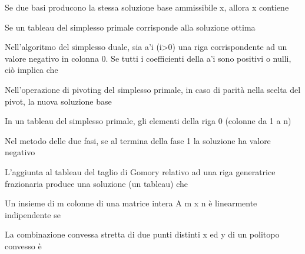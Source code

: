 \documentclass[answers, a4paper, 11pt]{exam}
\begin{document}
\begin{questions}
\begin{solution}
\end{solution}

\question Se due basi producono la stessa soluzione base ammissibile x, allora x contiene
\begin{solution}

\end{solution}

\question Se un tableau del simplesso primale corrisponde alla soluzione ottima
\begin{solution}

\end{solution}

\question Nell'algoritmo del simplesso duale, sia a'i (i>0) una riga corrispondente ad un valore negativo in colonna 0. Se tutti i coefficienti della a'i sono positivi o nulli, ciò implica che
\begin{solution}

\end{solution}

\question Nell'operazione di pivoting del simplesso primale, in caso di parità nella scelta del pivot, la nuova soluzione base
\begin{solution}

\end{solution}

\question In un tableau del simplesso primale, gli elementi della riga 0 (colonne da 1 a n)
\begin{solution}

\end{solution}

\question Nel metodo delle due fasi, se al termina della fase 1 la soluzione ha valore negativo
\begin{solution}

\end{solution}

\question L'aggiunta al tableau del taglio di Gomory relativo ad una riga generatrice frazionaria produce una soluzione (un tableau) che
\begin{solution}

\end{solution}

\question Un insieme di m colonne di una matrice intera A m x n è linearmente indipendente se
\begin{solution}

\end{solution}

\question La combinazione convessa stretta di due punti distinti x ed y di un politopo convesso è
\begin{solution}


\end{solution}
\end{questions}
\end{document}
